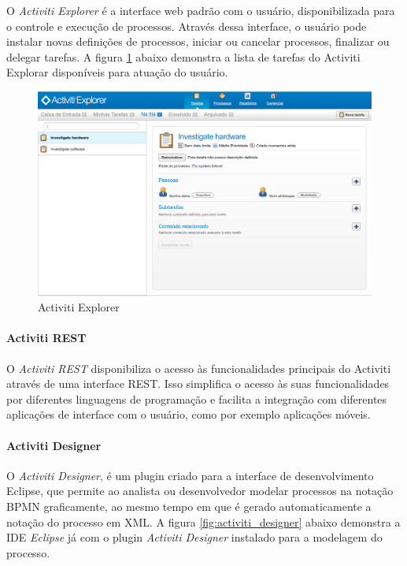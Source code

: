 O \textit{Activiti Explorer} é a interface web padrão com o usuário, disponibilizada para o controle e execução de processos. Através dessa interface, o usuário pode instalar novas definições de processos, iniciar ou cancelar processos, finalizar ou delegar tarefas. A figura \ref{fig:activiti_explorer} abaixo demonstra a lista de tarefas do Activiti Explorar disponíveis para atuação do usuário.

\begin{figure}[H]
\centering
\includegraphics[width=1\textwidth]{imagens/activiti_explorer.png}
\caption{Activiti Explorer}
\label{fig:activiti_explorer}
\end{figure}

\paragraph{Activiti REST}\label{sec:automatizacao_processos-gestao_processos_activiti_rest}

O \textit{Activiti REST} disponibiliza o acesso às funcionalidades principais do Activiti através de uma interface REST. Isso simplifica o acesso às suas funcionalidades por diferentes linguagens de programação e facilita a integração com diferentes aplicações de interface com o usuário, como por exemplo aplicações móveis.

\paragraph{Activiti Designer}\label{sec:automatizacao_processos-gestao_processos_activiti_designer}

O \textit{Activiti Designer}, é um plugin criado para a interface de desenvolvimento Eclipse, que permite ao analista ou desenvolvedor modelar processos na notação BPMN graficamente, ao mesmo tempo em que é gerado automaticamente a notação do processo em XML. A figura \ref{fig:activiti_designer} abaixo demonstra a IDE\cite{ide} \textit{Eclipse} já com o plugin \textit{Activiti Designer} instalado para a modelagem do processo.

